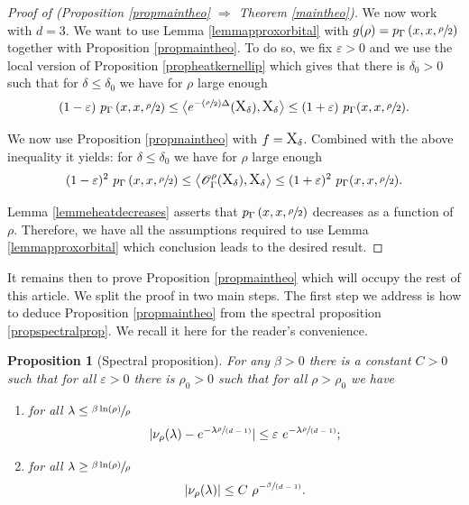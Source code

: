 \documentclass[10pt]{amsart}
\let\mathcal\mathscr
\let\epsilon\varepsilon
\newcommand{\Psfrac}[2]{(\sfrac{#1}{#2})}
\newcommand{\spfrac}[2]{\sfrac{#1}{(#2)}}
\theoremstyle{plain}
\newtheorem{proposition}[equation]{Proposition}
\theoremstyle{definition}
\begin{document}
\begin{proof}[Proof of (Proposition \ref{propmaintheo} $\Rightarrow$ Theorem \ref{maintheo})]
We now work with $d =3$. We want to use Lemma \ref{lemmapproxorbital} with $g(\rho) = p_{\Gamma}\left(x,x,\sfrac{\rho}{2}\right)$ together with Proposition \ref{propmaintheo}. To do so, we fix $\epsilon > 0$ and we use the local version of Proposition \ref{propheatkernellip} which gives that there is $\delta_0 >0$ such that for $\delta \le \delta_0$ we have for $\rho$ large enough
\[
(1 - \epsilon) \ p_{\Gamma}\left(x,x,\sfrac{\rho}{2} \right) \le \bigl< e^{- \Psfrac{\rho}{2} \Delta}(\text{\large{X}}_{\delta}), \text{\large{X}}_{\delta} \bigr> \le (1 + \epsilon) \ p_{\Gamma}(x,x,\sfrac{\rho}{2}).
\]

We now use Proposition \ref{propmaintheo} with $f = \text{\large{X}}_{\delta} $. Combined with the above inequality it yields: for $\delta \le \delta_0$ we have for $\rho$ large enough
\[
(1 - \epsilon)^2 \ p_{\Gamma}\left(x,x,\sfrac{\rho}{2} \right) \le \left< \mathcal{O}_{\Gamma}^{\rho}(\text{\large{X}}_{\delta}), \text{\large{X}}_{\delta} \right> \le (1 + \epsilon)^2 \ p_{\Gamma}(x,x,\sfrac{\rho}{2}).
\]

Lemma \ref{lemmeheatdecreases} asserts that $p_{\Gamma}\left(x,x,\sfrac{\rho}{2} \right)$ decreases as a function of $\rho$. Therefore, we have all the assumptions required to use Lemma \ref{lemmapproxorbital} which conclusion leads to the desired result.
\end{proof}

It remains then to prove Proposition \ref{propmaintheo} which will occupy the rest of this article. We split the proof in two main steps. The first step we address is how to deduce Proposition \ref{propmaintheo} from the spectral proposition \ref{propspectralprop}. We recall it here for the reader's convenience.

\begin{proposition}[Spectral proposition]
\label{propapproxvp}
For any $\beta >0$ there is a constant $C > 0$ such that for all $\epsilon > 0$ there is $\rho_0 > 0$ such that for all $\rho > \rho_0$ we have
\begin{enumerate}
\item for all $ \lambda \le \sfrac{\beta \ln (\rho) }{\rho} $
\[
| \nu_{\rho}(\lambda) - e^{-\lambda \spfrac{\rho}{d-1}}| \le \epsilon \ e^{ - \lambda \spfrac{\rho}{d-1}} ;
\]
\item for all $ \lambda \ge \sfrac{\beta \ln (\rho) }{\rho}$
\[
|\nu_{\rho}(\lambda)| \le C \ \rho^{-\spfrac{\beta}{d-1}}.
\]
\end{enumerate}
\end{proposition}
\end{document}
